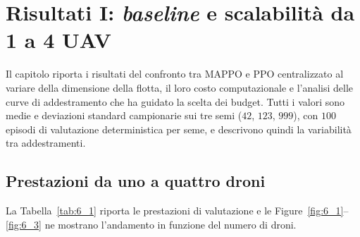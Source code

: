 \documentclass[12pt,a4paper,twoside]{report}
\newcommand{\fonte}[1][elaborazione propria]{\par\vspace{3pt}{\footnotesize\emph{Fonte: #1.}}}
\begin{document}
\chapter{Risultati I: \emph{baseline} e scalabilità da 1 a 4 UAV}
\label{chap:risultati_1}

Il capitolo riporta i risultati del confronto tra MAPPO e PPO centralizzato al variare della dimensione della flotta, il loro costo computazionale e l'analisi delle curve di addestramento che ha guidato la scelta dei budget. Tutti i valori sono medie e deviazioni standard campionarie sui tre semi ($42$, $123$, $999$), con $100$ episodi di valutazione deterministica per seme, e descrivono quindi la variabilità tra addestramenti.

\section{Prestazioni da uno a quattro droni}
\label{sec:prestazioni_1_4}

La Tabella~\ref{tab:6_1} riporta le prestazioni di valutazione e le Figure~\ref{fig:6_1}--\ref{fig:6_3} ne mostrano l'andamento in funzione del numero di droni.

\begin{table}[htbp]
    \centering
    \caption{Prestazioni di valutazione deterministica (media $\pm$ deviazione standard campionaria su 3 semi, 100 episodi per seme).}
    \label{tab:6_1}
    \fonte
\end{table}
\end{document}
